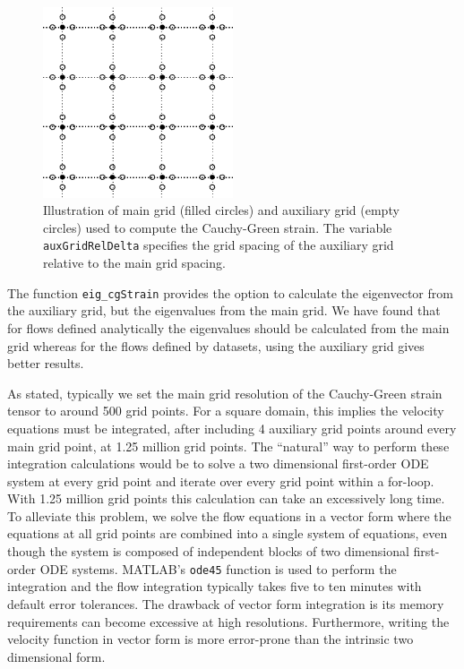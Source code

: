 \documentclass{article}
\begin{document}
\begin{figure}
\begin{center}
\includegraphics[width=0.5\textwidth]{graphics/main_aux_grids}
\end{center}
\caption{Illustration of main grid (filled circles) and auxiliary grid (empty circles) used to compute the Cauchy-Green strain. The variable \lstinline!auxGridRelDelta! specifies the grid spacing of the auxiliary grid relative to the main grid spacing.}
\label{f:main and auxiliary grids}
\end{figure}

The function \lstinline!eig_cgStrain! provides the option to calculate the eigenvector from the auxiliary grid, but the eigenvalues from the main grid. We have found that for flows defined analytically the eigenvalues should be calculated from the main grid whereas for the flows defined by datasets, using the auxiliary grid gives better results.

As stated, typically we set the main grid resolution of the Cauchy-Green strain tensor to around 500 grid points. For a square domain, this implies the velocity equations must be integrated, after including 4 auxiliary grid points around every main grid point, at 1.25 million grid points. The ``natural'' way to perform these integration calculations would be to solve a two dimensional first-order ODE system at every grid point and iterate over every grid point within a for-loop. With 1.25 million grid points this calculation can take an excessively long time. To alleviate this problem, we solve the flow equations in a vector form where the equations at all grid points are combined into a single system of equations, even though the system is composed of independent blocks of two dimensional first-order ODE systems. MATLAB's \lstinline!ode45! function is used to perform the integration and the flow integration typically takes five to ten minutes with default error tolerances. The drawback of vector form integration is its memory requirements can become excessive at high resolutions. Furthermore, writing the velocity function in vector form is more error-prone than the intrinsic two dimensional form.
\end{document}
